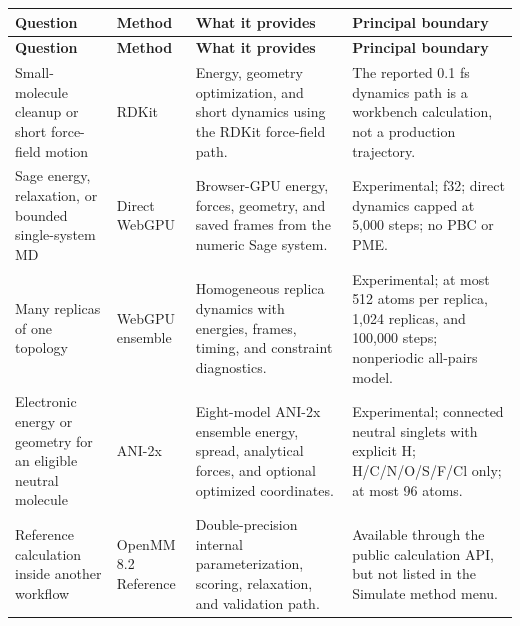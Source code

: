 \documentclass[11pt]{article}
\begin{document}
\begingroup
\footnotesize
\begin{longtable}{@{}p{1.31in}p{0.78in}p{1.77in}p{1.85in}@{}}
\toprule
\textbf{Question} & \textbf{Method} & \textbf{What it provides} & \textbf{Principal boundary}\\
\midrule
\endfirsthead
\toprule
\textbf{Question} & \textbf{Method} & \textbf{What it provides} & \textbf{Principal boundary}\\
\midrule
\endhead
Small-molecule cleanup or short force-field motion & RDKit & Energy, geometry optimization, and short dynamics using the RDKit force-field path. & The reported 0.1 fs dynamics path is a workbench calculation, not a production trajectory.\\
Sage energy, relaxation, or bounded single-system MD & Direct WebGPU & Browser-GPU energy, forces, geometry, and saved frames from the numeric Sage system. & Experimental; f32; direct dynamics capped at 5,000 steps; no PBC or PME.\\
Many replicas of one topology & WebGPU ensemble & Homogeneous replica dynamics with energies, frames, timing, and constraint diagnostics. & Experimental; at most 512 atoms per replica, 1,024 replicas, and 100,000 steps; nonperiodic all-pairs model.\\
Electronic energy or geometry for an eligible neutral molecule & ANI-2x & Eight-model ANI-2x ensemble energy, spread, analytical forces, and optional optimized coordinates. & Experimental; connected neutral singlets with explicit H; H/C/N/O/S/F/Cl only; at most 96 atoms.\\
Reference calculation inside another workflow & OpenMM 8.2 Reference & Double-precision internal parameterization, scoring, relaxation, and validation path. & Available through the public calculation API, but not listed in the Simulate method menu.\\
\bottomrule
\end{longtable}
\endgroup

\end{document}
